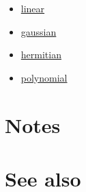 \documentclass{article}
\begin{document}
\begin{itemize}
\item \href{research/kml/documentation/linear.html}{linear}
\item \href{research/kml/documentation/gaussian.html}{gaussian}
\item \href{research/kml/documentation/hermitian.html}{hermitian}
\item \href{research/kml/documentation/polynomial.html}{polynomial}
\end{itemize}

\section*{Notes}


\section*{See also}




\end{document}
